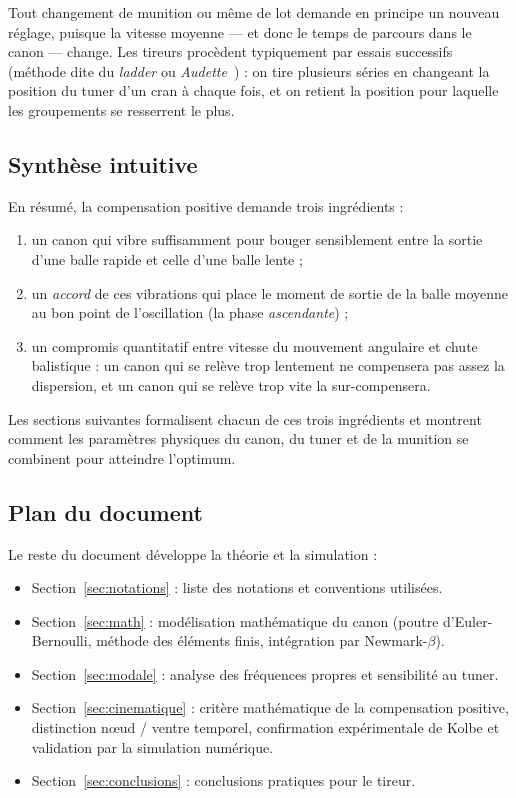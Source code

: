 \documentclass[12pt,a4paper]{article}
\begin{document}
	Tout changement de munition ou même de lot demande en principe un nouveau réglage, puisque la vitesse moyenne — et donc le temps de parcours dans le canon — change. Les tireurs procèdent typiquement par essais successifs (méthode dite du \emph{ladder} ou \emph{Audette}~\cite{Audette}) : on tire plusieurs séries en changeant la position du tuner d'un cran à chaque fois, et on retient la position pour laquelle les groupements se resserrent le plus.

	\subsection{Synthèse intuitive}

	En résumé, la compensation positive demande trois ingrédients :
	\begin{enumerate}
		\item un canon qui vibre suffisamment pour bouger sensiblement entre la sortie d'une balle rapide et celle d'une balle lente ;
		\item un \emph{accord} de ces vibrations qui place le moment de sortie de la balle moyenne au bon point de l'oscillation (la phase \emph{ascendante}) ;
		\item un compromis quantitatif entre vitesse du mouvement angulaire et chute balistique : un canon qui se relève trop lentement ne compensera pas assez la dispersion, et un canon qui se relève trop vite la sur-compensera.
	\end{enumerate}
	Les sections suivantes formalisent chacun de ces trois ingrédients et montrent comment les paramètres physiques du canon, du tuner et de la munition se combinent pour atteindre l'optimum.

	\subsection{Plan du document}
	\label{sec:plan}

	Le reste du document développe la théorie et la simulation :
	\begin{itemize}
		\item Section~\ref{sec:notations} : liste des notations et conventions utilisées.
		\item Section~\ref{sec:math} : modélisation mathématique du canon (poutre d'Euler-Bernoulli, méthode des éléments finis, intégration par Newmark-$\beta$).
		\item Section~\ref{sec:modale} : analyse des fréquences propres et sensibilité au tuner.
		\item Section~\ref{sec:cinematique} : critère mathématique de la compensation positive, distinction n\oe ud / ventre temporel, confirmation expérimentale de Kolbe et validation par la simulation numérique.
		\item Section~\ref{sec:conclusions} : conclusions pratiques pour le tireur.
	\end{itemize}
\end{document}
